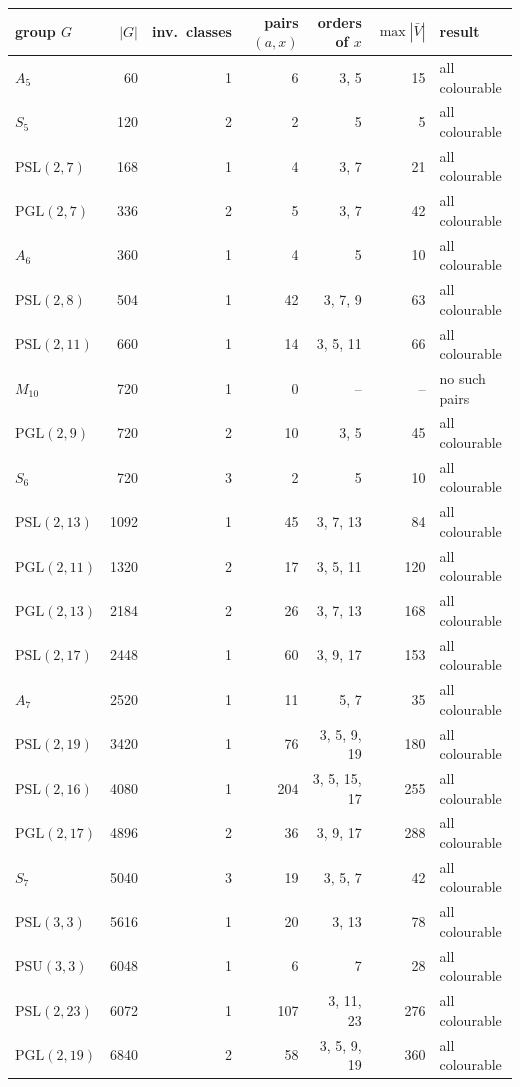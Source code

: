 \begin{tabular}{@{}lrrrrrl@{}}
\toprule
group $G$ & $|G|$ & inv.\ classes & pairs $(a,x)$ & orders of $x$ & $\max|\bar V|$ & result\\
\midrule
$A_5$ & 60 & 1 & 6 & 3, 5 & 15 & all colourable\\
$S_5$ & 120 & 2 & 2 & 5 & 5 & all colourable\\
$\mathrm{PSL}(2,7)$ & 168 & 1 & 4 & 3, 7 & 21 & all colourable\\
$\mathrm{PGL}(2,7)$ & 336 & 2 & 5 & 3, 7 & 42 & all colourable\\
$A_6$ & 360 & 1 & 4 & 5 & 10 & all colourable\\
$\mathrm{PSL}(2,8)$ & 504 & 1 & 42 & 3, 7, 9 & 63 & all colourable\\
$\mathrm{PSL}(2,11)$ & 660 & 1 & 14 & 3, 5, 11 & 66 & all colourable\\
$M_{10}$ & 720 & 1 & 0 & -- & -- & no such pairs\\
$\mathrm{PGL}(2,9)$ & 720 & 2 & 10 & 3, 5 & 45 & all colourable\\
$S_6$ & 720 & 3 & 2 & 5 & 10 & all colourable\\
$\mathrm{PSL}(2,13)$ & 1092 & 1 & 45 & 3, 7, 13 & 84 & all colourable\\
$\mathrm{PGL}(2,11)$ & 1320 & 2 & 17 & 3, 5, 11 & 120 & all colourable\\
$\mathrm{PGL}(2,13)$ & 2184 & 2 & 26 & 3, 7, 13 & 168 & all colourable\\
$\mathrm{PSL}(2,17)$ & 2448 & 1 & 60 & 3, 9, 17 & 153 & all colourable\\
$A_7$ & 2520 & 1 & 11 & 5, 7 & 35 & all colourable\\
$\mathrm{PSL}(2,19)$ & 3420 & 1 & 76 & 3, 5, 9, 19 & 180 & all colourable\\
$\mathrm{PSL}(2,16)$ & 4080 & 1 & 204 & 3, 5, 15, 17 & 255 & all colourable\\
$\mathrm{PGL}(2,17)$ & 4896 & 2 & 36 & 3, 9, 17 & 288 & all colourable\\
$S_7$ & 5040 & 3 & 19 & 3, 5, 7 & 42 & all colourable\\
$\mathrm{PSL}(3,3)$ & 5616 & 1 & 20 & 3, 13 & 78 & all colourable\\
$\mathrm{PSU}(3,3)$ & 6048 & 1 & 6 & 7 & 28 & all colourable\\
$\mathrm{PSL}(2,23)$ & 6072 & 1 & 107 & 3, 11, 23 & 276 & all colourable\\
$\mathrm{PGL}(2,19)$ & 6840 & 2 & 58 & 3, 5, 9, 19 & 360 & all colourable\\

\end{tabular}
